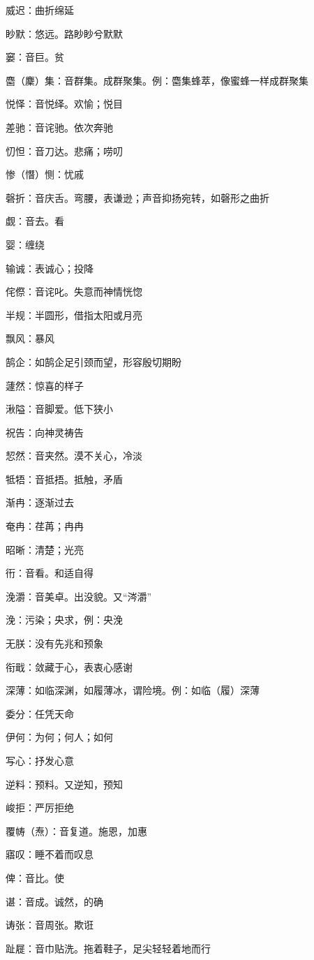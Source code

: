 威迟：曲折绵延

眇默：悠远。路眇眇兮默默

窭：音巨。贫

麕（麇）集：音群集。成群聚集。例：麕集蜂萃，像蜜蜂一样成群聚集

悦怿：音悦绎。欢愉；悦目

差驰：音诧驰。依次奔驰

忉怛：音刀达。悲痛；唠叨

惨（憯）恻：忧戚

磬折：音庆舌。弯腰，表谦逊；声音抑扬宛转，如磬形之曲折

觑：音去。看

婴：缠绕

输诚：表诚心；投降

侘傺：音诧叱。失意而神情恍惚

半规：半圆形，借指太阳或月亮

飘风：暴风

鹄企：如鹄企足引颈而望，形容殷切期盼

蘧然：惊喜的样子

湫隘：音脚爱。低下狭小

祝告：向神灵祷告

恝然：音夹然。漠不关心，冷淡

牴牾：音抵捂。抵触，矛盾

渐冉：逐渐过去

奄冉：荏苒；冉冉

昭晰：清楚；光亮

衎：音看。和适自得

浼灂：音美卓。出没貌。又“涔灂”

浼：污染；央求，例：央浼

无朕：没有先兆和预象

衔戢：敛藏于心，表衷心感谢

深薄：如临深渊，如履薄冰，谓险境。例：如临（履）深薄

委分：任凭天命

伊何：为何；何人；如何

写心：抒发心意

逆料：预料。又逆知，预知

峻拒：严厉拒绝

覆帱（焘）：音复道。施恩，加惠

寤叹：睡不着而叹息

俾：音比。使

谌：音成。诚然，的确

诪张：音周张。欺诳

趾屣：音巾贴洗。拖着鞋子，足尖轻轻着地而行

